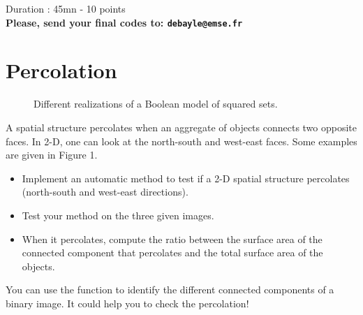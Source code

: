 
\noindent
Duration : 45mn - 10 points\\
{\bf Please, send your final codes to: \texttt{debayle@emse.fr}}\\


\section{Percolation}
\begin{figure}[htbp]
 \centering
 \hspace*{0.5cm}
 \hspace*{0.5cm}
 \caption{Different realizations of a Boolean model of squared sets.}
 \label{fig:exam_2016:seeds}
\end{figure}

A spatial structure percolates when an aggregate of objects connects two opposite faces. In 2-D, one can look at the north-south and west-east faces. Some examples are given in Figure 1. 

\begin{qbox}
\begin{itemize}
\item Implement an automatic method to test if a 2-D spatial structure percolates (north-south and west-east directions).
\item Test your method on the three given images.
\item When it percolates, compute the ratio between the surface area of the connected component that percolates and the total surface area of the objects.
\end{itemize}
\end{qbox}

\begin{mcomment}
\begin{mremark}
You can use the function  to identify the different connected components of a binary image. It could help you to check the percolation!
\end{mremark}
\end{mcomment}

